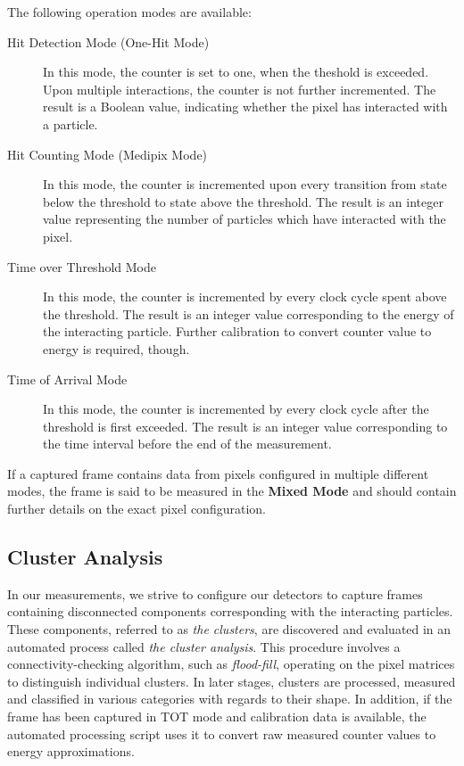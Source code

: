 The following operation modes are available:

\begin{description}
	\item[Hit Detection Mode (One-Hit Mode)]
	In this mode, the counter is set to one, when the theshold is exceeded. Upon multiple interactions, the counter is not further incremented. The result is a Boolean value, indicating whether the pixel has interacted with a particle.

	\item[Hit Counting Mode (Medipix Mode)]
	In this mode, the counter is incremented upon every transition from state below the threshold to state above the threshold. The result is an integer value representing the number of particles which have interacted with the pixel.

	\item[Time over Threshold Mode]
	In this mode, the counter is incremented by every clock cycle spent above the threshold. The result is an integer value corresponding to the energy of the interacting particle. Further calibration to convert counter value to energy is required, though.

	\item[Time of Arrival Mode]
	In this mode, the counter is incremented by every clock cycle after the threshold is first exceeded. The result is an integer value corresponding to the time interval before the end of the measurement.
\end{description}

If a captured frame contains data from pixels configured in multiple different modes, the frame is said to be measured in the \textbf{Mixed Mode} and should contain further details on the exact pixel configuration.


\subsection{Cluster Analysis}
In our measurements, we strive to configure our detectors to capture frames containing disconnected components corresponding with the interacting particles. These components, referred to as \textit{the clusters}, are discovered and evaluated in an automated process called \textit{the cluster analysis}. This procedure involves a connectivity-checking algorithm, such as \textit{flood-fill}, operating on the pixel matrices to distinguish individual clusters. In later stages, clusters are processed, measured and classified in various categories with regards to their shape. In addition, if the frame has been captured in TOT mode and calibration data is available, the automated processing script uses it to convert raw measured counter values to energy approximations.


